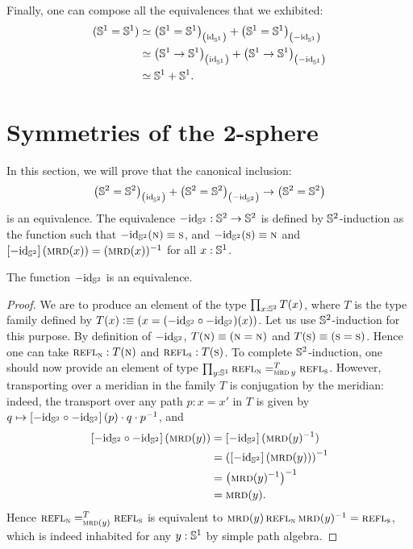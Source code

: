 \documentclass[english,a4paper]{lmcs}
\begin{document}
Finally, one can compose all the equivalences that we exhibited:
\begin{align*}
  ({{\mathbb S^{1}}}={{\mathbb S^{1}}})
  & \simeq {\left({{\mathbb S^{1}}}= {{\mathbb S^{1}}}\right)}_{\left(\mathord{\mathrm{id}}_{{\mathbb S^{1}}}\right)}
    + {\left({{\mathbb S^{1}}} = {{\mathbb S^{1}}}\right)}_{\left(-\mathord{\mathrm{id}}_{{\mathbb S^{1}}}\right)}
  \\
  & \simeq {\left({{\mathbb S^{1}}}\to {{\mathbb S^{1}}}\right)}_{\left(\mathord{\mathrm{id}}_{{\mathbb S^{1}}}\right)}
    + {\left({{\mathbb S^{1}}} \to {{\mathbb S^{1}}}\right)}_{\left(-\mathord{\mathrm{id}}_{{\mathbb S^{1}}}\right)}
  \\
  & \simeq {{\mathbb S^{1}}} + {{\mathbb S^{1}}}.
\end{align*}

\section{Symmetries of the \texorpdfstring{$\boldsymbol 2$}{2}-sphere}
\label{sec:sphere}

In this section, we will prove that the canonical inclusion:
\begin{equation}
  \label{eq:goal-section-sphere}
  \conncomp{\left(\Sp = \Sp\right)}{\id_\Sp} +
  \conncomp{\left(\Sp = \Sp\right)}{-\id_\Sp}
  \to
  \left(\Sp = \Sp\right)
\end{equation}
is an equivalence. The equivalence $-\mathord{\mathrm{id}}_{{\mathbb S^{2}}} : {{\mathbb S^{2}}} \to {{\mathbb S^{2}}}$ is
defined by ${{\mathbb S^{2}}}$-induction as the function such that
$-\mathord{\mathrm{id}}_{{\mathbb S^{2}}}(\textsc{n}) \equiv \textsc{s}$, and $-\mathord{\mathrm{id}}_{{\mathbb S^{2}}}(\textsc{s}) \equiv \textsc{n}$ and
$\left[{-\mathord{\mathrm{id}}_{{\mathbb S^{2}}}}\right](\operatorname{\textsc{mrd}}(x)) = (\operatorname{\textsc{mrd}}(x))^{-1}$ for all $x:{{\mathbb S^{1}}}$.

\begin{lem}
  The function $-\mathord{\mathrm{id}}_{{\mathbb S^{2}}}$ is an equivalence.
  \label{lem:minus-id-equivalence}
\end{lem}
\begin{proof}
  We are to produce an element of the type $\prod_{x:{{\mathbb S^{2}}}}T(x)$,
  where $T$ is the type family defined by
  $T(x)\vcentcolon\equiv (x= (-\mathord{\mathrm{id}}_{{\mathbb S^{2}}} \circ -\mathord{\mathrm{id}}_{{\mathbb S^{2}}})(x))$.
  Let us use ${{\mathbb S^{2}}}$-induction for this purpose.
  By definition of $-\mathord{\mathrm{id}}_{{\mathbb S^{2}}}$,
  $T(\textsc{n}) \equiv (\textsc{n}=\textsc{n})$
  and $T(\textsc{s}) \equiv (\textsc{s}=\textsc{s})$.
  Hence one can take $\mathop{{\textsc{refl}}_{\textsc{n}}}:T(\textsc{n})$
  and $\mathop{{\textsc{refl}}_{\textsc{s}}}:T(\textsc{s})$.
  To complete ${{\mathbb S^{2}}}$-induction, one should now provide an element
  of type $\prod_{y:{{\mathbb S^{1}}}} \mathop{{\textsc{refl}}_{\textsc{n}}} =^{T}_{\operatorname{\textsc{mrd}} y} \mathop{{\textsc{refl}}_{\textsc{s}}}$.
  However,
  transporting over a meridian in the family $T$ is conjugation by the
  meridian: indeed, the transport over any path $p:x=x'$ in $T$ is given by
  $q\mapsto \left[{-\mathord{\mathrm{id}}_{{\mathbb S^{2}}} \circ -\mathord{\mathrm{id}}_{{\mathbb S^{2}}}}\right](p) \cdot q \cdot p^{-1}$, and
  \begin{align*}
    \ap{-\id_\Sp \circ -\id_\Sp} (\mrd(y))
     &= \ap{-\id_\Sp}(\inv {\mrd(y)})
    \\ &= \inv {\left( \ap{-\id_\Sp}(\mrd(y)) \right)}
    \\ &= \inv { \left( \inv{\mrd(y)} \right) }
    \\ &= \mrd(y).
  \end{align*}
  Hence $\mathop{{\textsc{refl}}_{\textsc{n}}} =^{T}_{\operatorname{\textsc{mrd}}(y)} \mathop{{\textsc{refl}}_{\textsc{s}}}$
  is equivalent to
  $\operatorname{\textsc{mrd}}(y)\mathop{{\textsc{refl}}_{\textsc{n}}} \operatorname{\textsc{mrd}}(y)^{-1} = \mathop{{\textsc{refl}}_{\textsc{s}}}$, which is indeed inhabited for any
  $y:{{\mathbb S^{1}}}$ by simple path algebra.
\end{proof}
\end{document}
